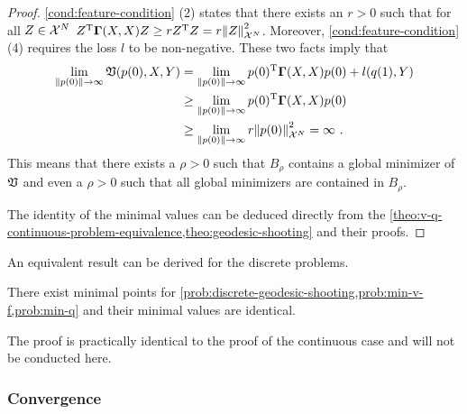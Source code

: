 \begin{proof}
	\cref{cond:feature-condition} (2) states that there exists an $r > 0$ such that for all $Z \in \mathcal{X}^N$ $Z^{\mathrm{T}} \mathbf{\Gamma}(X, X) Z \geq r Z^{\mathrm{T}} Z = r \norm{Z}_{\mathcal{X}^N}^2$.
	Moreover, \cref{cond:feature-condition} (4) requires the loss $l$ to be non-negative.
	These two facts imply that
	\begin{align}
		\lim_{\norm{p(0)} \rightarrow \infty} \mathfrak{V}(p(0), X, Y) 
		&= \lim_{\norm{p(0)} \rightarrow \infty} p(0)^{\mathrm{T}} \mathbf{\Gamma}(X, X) p(0) + l(q(1), Y)\\
		& \geq 	\lim_{\norm{p(0)} \rightarrow \infty} p(0)^{\mathrm{T}} \mathbf{\Gamma}(X, X) p(0) \\
		& \geq \lim_{\norm{p(0)} \rightarrow \infty} r \norm{p(0)}_{\mathcal{X}^N}^2
		= \infty \ .
	\end{align}
	This means that there exists a $\rho > 0$ such that $B_\rho$ contains a global minimizer of $\mathfrak{V}$ and even a $\rho > 0$ such that all global minimizers are contained in $B_\rho$.
	
	The identity of the minimal values can be deduced directly from the \cref{theo:v-q-continuous-problem-equivalence,theo:geodesic-shooting} and their proofs.
\end{proof}

An equivalent result can be derived for the discrete problems.
\begin{theorem}
	\label{theo:discrete-solutions-existence}
	There exist minimal points for \cref{prob:discrete-geodesic-shooting,prob:min-v-f,prob:min-q} and their minimal values are identical.
\end{theorem}
The proof is practically identical to the proof of the continuous case and will not be conducted here.

\subsubsection{Convergence}

